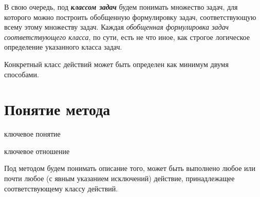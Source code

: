 В свою очередь, под \textbf{\textit{классом задач}} будем понимать множество задач, для которого можно построить обобщенную формулировку задач, соответствующую всему этому множеству задач. Каждая \textit{обобщенная формулировка задач соответствующего класса}, по сути, есть не что иное, как строгое логическое определение указанного класса задач.

\begin{SCn}
\end{SCn}

Конкретный класс действий может быть определен как минимум двумя способами.

\begin{SCn}

	\begin{scnsubdividing}
		\begin{scnindent}
		\end{scnindent}
	\end{scnsubdividing}
\end{SCn}


\section{Понятие метода}
\label{sec_method_concept}
\begin{SCn}
	\begin{scnrelfromlist}{ключевое понятие}
	\end{scnrelfromlist}

	\begin{scnrelfromlist}{ключевое отношение}
	\end{scnrelfromlist}
\end{SCn}

Под методом будем понимать описание того,  может быть выполнено любое или почти любое (с явным указанием исключений) действие, принадлежащее соответствующему классу действий.

